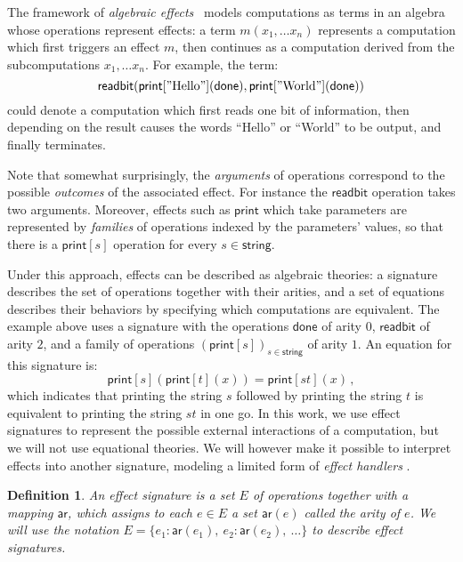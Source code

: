 \documentclass[draft,11pt]{report}
\newtheorem{definition}{Definition}
\newcommand{\kw}[1]{\ensuremath{ \mathsf{#1} }}
\begin{document}
The framework of \emph{algebraic effects}~\cite{effadq}
models computations as terms in an algebra
whose operations represent effects:
a term $m(x_1, \ldots x_n)$
represents a computation which first
triggers an effect $m$,
then continues as a computation derived from
the subcomputations $x_1, \ldots x_n$.
For example,
the term:
\[
    \kw{readbit}(
      \kw{print}["\text{Hello}"](\kw{done}),
      \kw{print}["\text{World}"](\kw{done}))
\]
could denote a computation which
first reads one bit of information,
then depending on the result
causes the words ``Hello'' or ``World'' to be output,
and finally terminates.

Note that somewhat surprisingly,
the \emph{arguments} of operations correspond to
the possible \emph{outcomes} of the associated effect.
For instance the $\kw{readbit}$ operation takes two arguments.
Moreover,
effects such as $\kw{print}$
which take parameters
are represented by \emph{families}
of operations indexed by the parameters' values,
so that there is a $\kw{print}[s]$
operation for every $s \in \kw{string}$.

Under this approach,
effects can be described as algebraic theories:
a signature describes the set of operations together with their arities,
and a set of equations describes their behaviors
by specifying which computations are equivalent.
The example above uses a signature with the operations
$\kw{done}$ of arity $0$,
$\kw{readbit}$ of arity $2$,
and a family of operations $(\kw{print}[s])_{s \in \kw{string}}$
of arity $1$.
An equation for this signature is:
\[
    \kw{print}[s](\kw{print}[t](x)) =
    \kw{print}[st](x) \,,
\]
which indicates that
printing the string $s$ followed by
printing the string $t$ is equivalent to
printing the string $st$ in one go.
In this work,
we use effect signatures to represent
the possible external interactions
of a computation,
but we will not use equational theories.
We will however make it possible to interpret effects
into another signature,
modeling a limited form of
\emph{effect handlers} \cite{eff}.

\begin{definition} \label{def:esig}
An \emph{effect signature}
is a set $E$ of operations
together with a mapping $\kw{ar}$,
which assigns to each $e \in E$ a set $\kw{ar}(e)$
called the \emph{arity} of $e$.
We will use the notation
$E = \{ e_1 : \kw{ar}(e_1), \: e_2 : \kw{ar}(e_2), \: \ldots \}$
to describe effect signatures.
\end{definition}
\end{document}
